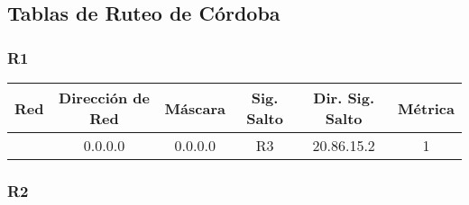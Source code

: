 
\subsection{Tablas de Ruteo de Córdoba}

\subsubsection{R1}
\begin{tabular}{|c|c|c|c|c|c|}
	\hline
	Red & Dirección de Red & Máscara & Sig. Salto & Dir. Sig. Salto & Métrica \\
	\hline
	& 0.0.0.0 & 0.0.0.0 & R3 & 20.86.15.2 & 1\\
	\hline
\end{tabular}


\subsubsection{R2}
